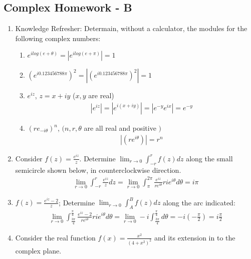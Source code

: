 \documentclass[12pt]{article}
\begin{document}
\subsection{Complex Homework - B}
\begin{enumerate}

    \item Knowledge Refresher:
	    Determain, without a calculator, the modules for the following complex numbers: 
	    \begin{enumerate}

	        \item $e^{ilog(e+\theta)}=|e^{ilog(e+\pi)}|=1$
		\item $(e^{i0.123456788 \pi})^{2}=|(e^{i0.123456788 \pi})^{2}|=1$
		\item $e^{iz}$, $z=x+iy$ ($x,y$ are real) 
			\begin{align*}
			    |e^{iz}|=|e^{i(x+iy)}|=|e^{-y}e^{ix}|=e^{-y}
			\end{align*}
		\item $(re_{-i \theta})^{n}$, $(n,r,\theta$ are all real and positive $)$
			\begin{align*}
			    |(re^{i \theta})|=r^{n}
			\end{align*}

	    \end{enumerate}
	
	\item Consider $f(z) = \frac{e^{iz}}{z}$. Determine $\lim_{r\to0} \int_{-r}^{r}f(z)dz$ along the small semicircle shown below, in counterclockwise direction.
		\begin{align*}
		    \lim_{r\rightarrow 0} \int_{-r}^{r}\frac{e^{iz}}{z}dz= \lim_{r\rightarrow 0}\int_{\pi}^{2\pi}\frac{e^{iz}}{re^{i \theta}}rie^{i \theta} d \theta=i\pi
		\end{align*}
	\item $f(z)=\frac{e^{iz}-2}{z}$; Determine $\lim_{r\to0}\int_{A}^{B}f(z)dz$ along the arc indicated:
		\begin{align*}
		    \lim_{r\rightarrow 0}\int_{\frac{3\pi}{4}}^{\frac{\pi}{4}}\frac{e^{iz}-2}{re^{i \theta}}rie^{i \theta} d \theta= \lim_{r\rightarrow 0}-i \int_{\frac{3\pi}{4}}^{\frac{\pi}{4}}d \theta= -i(-\frac{\pi}{2})=i \frac{\pi}{2}
		\end{align*}

	\item Consider the real function $f(x)= \frac{x^{2}}{(4+x^{2})^{2}}$ and its extension in to the complex plane.
		\begin{enumerate}


\end{enumerate}
\end{enumerate}
\end{document}
